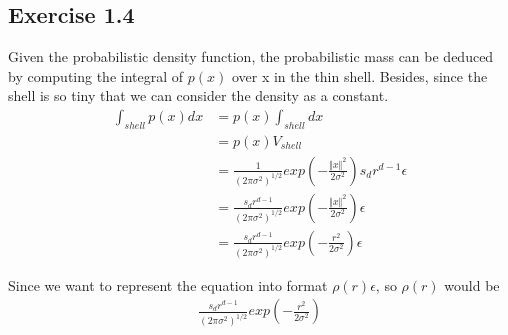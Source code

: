 \documentclass{article} %
\begin{document}
\subsection{Exercise 1.4}
Given the probabilistic density function, the probabilistic mass can be deduced by computing the integral of $p(x)$ over x in the thin shell. Besides, since the shell is so tiny that we can consider the density as a constant.
\begin{equation}
\begin{split}
\int_{shell} p(x)dx &= p(x)\int_{shell}dx \\
&= p(x)V_{shell}\\
&=\frac{1}{(2\pi\sigma^2)^{1/2}}exp(-\frac{\Vert x\Vert^2}{2\sigma^2})s_{d}r^{d-1}\epsilon\\
&=\frac{s_{d}r^{d-1}}{(2\pi\sigma^2)^{1/2}}exp(-\frac{\Vert x\Vert^2}{2\sigma^2})\epsilon\\
&=\frac{s_{d}r^{d-1}}{(2\pi\sigma^2)^{1/2}}exp(-\frac{r^2}{2\sigma^2})\epsilon
\end{split}
\end{equation}

Since we want to represent the equation into format $\rho(r)\epsilon$, so $\rho(r)$ would be
\begin{equation}
    \begin{split}
    \frac{s_{d}r^{d-1}}{(2\pi\sigma^2)^{1/2}}exp(-\frac{r^2}{2\sigma^2})
    \end{split}
\end{equation}
\end{document}
